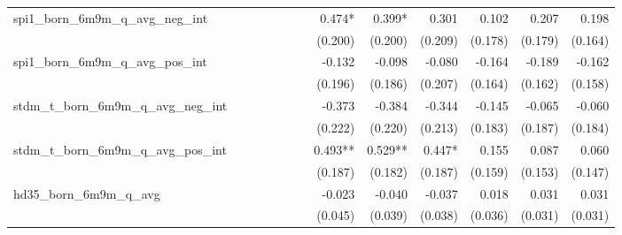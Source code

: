 \begin{tabular}{lrrrrrrrrrrrr}
spi1\_born\_6m9m\_q\_avg\_neg\_int          &              &              &              &              &              &              &       0.474* &       0.399* &        0.301 &        0.102 &        0.207 &        0.198 \\ 
                                            &              &              &              &              &              &              &      (0.200) &      (0.200) &      (0.209) &      (0.178) &      (0.179) &      (0.164) \\ 
spi1\_born\_6m9m\_q\_avg\_pos\_int          &              &              &              &              &              &              &       -0.132 &       -0.098 &       -0.080 &       -0.164 &       -0.189 &       -0.162 \\ 
                                            &              &              &              &              &              &              &      (0.196) &      (0.186) &      (0.207) &      (0.164) &      (0.162) &      (0.158) \\ 
stdm\_t\_born\_6m9m\_q\_avg\_neg\_int       &              &              &              &              &              &              &       -0.373 &       -0.384 &       -0.344 &       -0.145 &       -0.065 &       -0.060 \\ 
                                            &              &              &              &              &              &              &      (0.222) &      (0.220) &      (0.213) &      (0.183) &      (0.187) &      (0.184) \\ 
stdm\_t\_born\_6m9m\_q\_avg\_pos\_int       &              &              &              &              &              &              &      0.493** &      0.529** &       0.447* &        0.155 &        0.087 &        0.060 \\ 
                                            &              &              &              &              &              &              &      (0.187) &      (0.182) &      (0.187) &      (0.159) &      (0.153) &      (0.147) \\ 
hd35\_born\_6m9m\_q\_avg                    &              &              &              &              &              &              &       -0.023 &       -0.040 &       -0.037 &        0.018 &        0.031 &        0.031 \\ 
                                            &              &              &              &              &              &              &      (0.045) &      (0.039) &      (0.038) &      (0.036) &      (0.031) &      (0.031) \\ 

\end{tabular}
